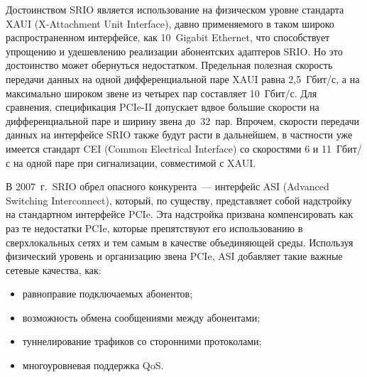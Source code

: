\begin{multicols}{2}
     Достоинством SRIO является использование на физическом уровне стандарта XAUI 
(X-Attachment Unit Interface), давно применяемого в таком широко распространенном 
интерфейсе, как 10~Gigabit Ethernet, что способствует упрощению и уде\-шев\-ле\-нию 
реализации абонентских адаптеров SRIO. Но это достоинство может обернуться 
недостатком. Предельная полезная скорость передачи данных на одной дифференциальной 
паре XAUI равна 2,5~Гбит/с, а на максимально широком звене из четырех пар составляет 
10~Гбит/с. Для сравнения, спецификация PCIe-II допускает вдвое большие скорости на 
дифференциальной паре и ширину звена до~32~пар. Впрочем, скорости передачи данных на 
интерфейсе SRIO также будут расти в дальнейшем, в частности уже имеется стандарт CEI 
(Common Electrical Interface) со скоростями 6 и 11~Гбит/с на одной паре при сигнализации, 
совместимой с XAUI.
     
     В 2007~г.\ SRIO обрел опасного конкурента~--- интерфейс ASI (Advanced Switching 
Interconnect), который, по существу, представляет собой надстройку на стандартном 
интерфейсе PCIe. Эта надстройка призвана компенсировать как раз те недостатки PCIe, 
которые препятствуют его использованию в сверхлокальных сетях и тем самым в качестве 
объединяющей среды. Используя физический уровень и организацию звена PCIe, ASI 
добавляет такие важные сетевые качества, как:
     \begin{itemize}
\item равноправие подключаемых абонентов;
\item возможность обмена сообщениями между абонентами;
\item туннелирование трафиков со сторонними протоколами;
\item многоуровневая поддержка QoS.
\end{itemize}


\end{multicols}
